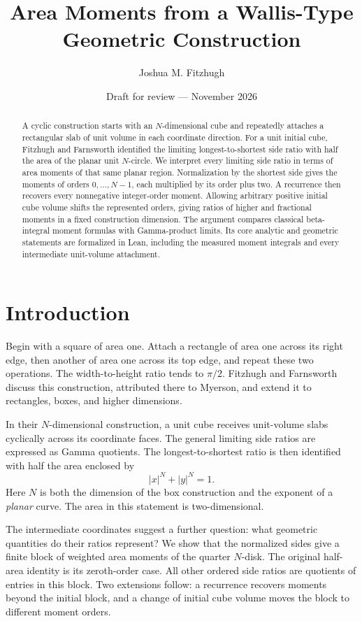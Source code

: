 \documentclass[11pt]{article}
\title{Area Moments from a Wallis-Type\\Geometric Construction}
\author{Joshua M. Fitzhugh}
\date{Draft for review --- November 2026}
\numberwithin{equation}{section}
\theoremstyle{remark}
\begin{document}
\maketitle

\begin{abstract}
A cyclic construction starts with an $N$-dimensional cube and repeatedly
attaches a rectangular slab of unit volume in each coordinate direction.
For a unit initial cube, Fitzhugh and Farnsworth identified the limiting
longest-to-shortest side ratio with half the area of the planar unit
$N$-circle. We interpret every limiting side ratio in terms of area moments
of that same planar region. Normalization by the shortest side gives the
moments of orders $0,\ldots,N-1$, each multiplied by its order plus two.
A recurrence then recovers every nonnegative integer-order moment.
Allowing arbitrary positive initial cube volume shifts the represented
orders, giving ratios of higher and fractional moments in a fixed
construction dimension. The argument compares classical beta-integral
moment formulas with Gamma-product limits. Its core analytic and geometric
statements are formalized in Lean, including the measured moment integrals
and every intermediate unit-volume attachment.
\end{abstract}

\section{Introduction}
\label{sec:introduction}

Begin with a square of area one. Attach a rectangle of area one across
its right edge, then another of area one across its top edge, and repeat
these two operations. The width-to-height ratio tends to $\pi/2$.
Fitzhugh and Farnsworth~\cite{FitzhughFarnsworth2013} discuss this
construction, attributed there to Myerson, and extend it to rectangles,
boxes, and higher dimensions.

In their $N$-dimensional construction, a unit cube receives unit-volume
slabs cyclically across its coordinate faces. The general limiting
side ratios are expressed as Gamma quotients. The longest-to-shortest
ratio is then identified with half the area enclosed by
\[
  |x|^N+|y|^N=1.
\]
Here $N$ is both the dimension of the box construction and the exponent
of a \emph{planar} curve. The area in this statement is two-dimensional.

The intermediate coordinates suggest a further question: what geometric
quantities do their ratios represent? We show that the normalized sides
give a finite block of weighted area moments of the quarter $N$-disk.
The original half-area identity is its zeroth-order case.
All other ordered side ratios are quotients of entries in this block.
Two extensions follow: a recurrence recovers moments beyond the initial
block, and a change of initial cube volume moves the block to different
moment orders.
\end{document}
